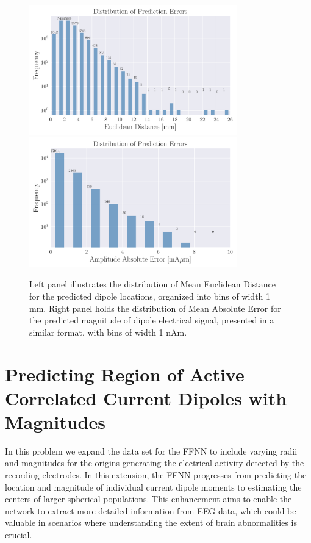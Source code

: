 \documentclass[a4paper, UKenglish, 11pt]{uiomaster}
\begin{document}
\begin{figure}
  \hspace*{-2.8cm} %
  \includegraphics[width=9cm]{figures/new_histogram_position_amplitude.pdf}
  \includegraphics[width=9cm]{figures/new_histogram_amplitude_amplitude.pdf}
  \caption{Left panel illustrates the distribution of Mean Euclidean Distance for the predicted dipole locations, organized into bins of width 1 mm. Right panel holds the distribution of Mean Absolute Error for the predicted magnitude of dipole electrical signal, presented in a similar format, with bins of width 1 nAm.}
  \label{fig:histogram_magnitude}
\end{figure}


\section{Predicting Region of Active Correlated Current Dipoles with Magnitudes} \label{sec:result_area}
In this problem we expand the data set for the FFNN to include varying radii and magnitudes for the origins generating the electrical activity detected by the recording electrodes. In this extension, the FFNN progresses from predicting the location and magnitude of individual current dipole moments to estimating the centers of larger spherical populations. This enhancement aims to enable the network to extract more detailed information from EEG data, which could be valuable in scenarios where understanding the extent of brain abnormalities is crucial.
\end{document}
